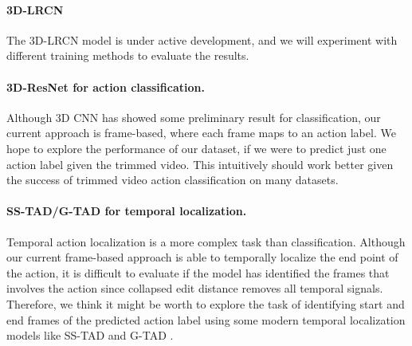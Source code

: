 \documentclass[10pt,twocolumn,letterpaper]{article}
\begin{document}
\paragraph{3D-LRCN} The 3D-LRCN model is under active development, and we will experiment with different training methods to evaluate the results. 

\paragraph{3D-ResNet for action classification.} Although 3D CNN has showed some preliminary result for classification, our current approach is frame-based, where each frame maps to an action label. We hope to explore the performance of our dataset, if we were to predict just one action label given the trimmed video. This intuitively should work better given the success of trimmed video action classification on many datasets. 


\paragraph{SS-TAD/G-TAD for temporal localization.} Temporal action localization is a more complex task than classification. Although our current frame-based approach is able to temporally localize the end point of the action, it is difficult to evaluate if the model has identified the frames that involves the action since collapsed edit distance removes all temporal signals. Therefore, we think it might be worth to explore the task of identifying start and end frames of the predicted action label using some modern temporal localization models like SS-TAD \cite{ss-tad} and G-TAD \cite{g-tad}.

\clearpage

{\small


}
\end{document}
